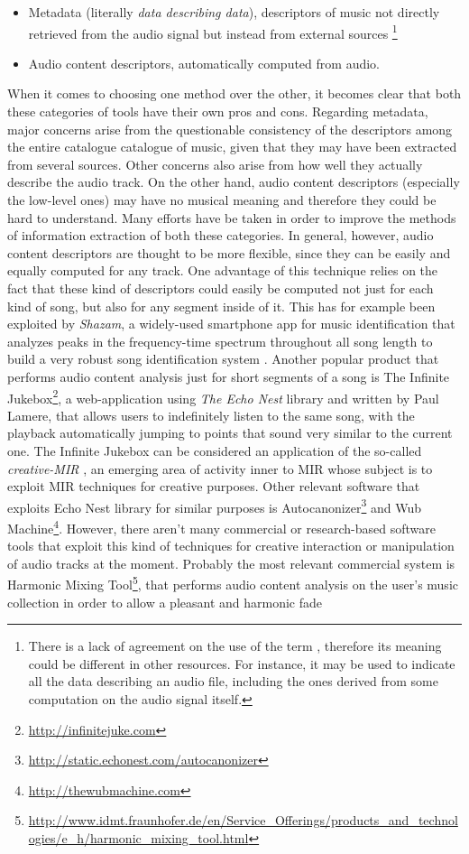 \begin{itemize}
\item Metadata (literally \textit{data describing data}), descriptors of music not directly retrieved from the audio signal but instead from external sources \footnote{There is a lack of agreement on the use of the term , therefore its meaning could be different in other resources. For instance, it may be used to indicate all the data describing an audio file, including the ones derived from some computation on the audio signal itself.}
\item Audio content descriptors, automatically computed from audio.
\end{itemize}
When it comes to choosing one method over the other, it becomes clear that both these categories of tools have their own pros and cons. Regarding metadata, major concerns arise from the questionable consistency of the descriptors among the entire catalogue catalogue of music, given that they may have been extracted from several sources. Other concerns also arise from how well they actually describe the audio track. On the other hand, audio content descriptors (especially the low-level ones) may have no musical meaning and therefore they could be hard to understand. Many efforts have be taken in order to improve the methods of information extraction of both these categories. In general, however, audio content descriptors are thought to be more flexible, since they can be easily and equally computed for any track. One advantage of this technique relies on the fact that these kind of descriptors could easily be computed not just for each kind of song, but also for any segment inside of it. This has for example been exploited by \textit{Shazam}, a widely-used smartphone app for music identification that analyzes peaks in the frequency-time spectrum throughout all song length to build a very robust song identification system \cite{shazam03}. Another popular product that performs audio content analysis just for short segments of a song is The Infinite Jukebox\footnote{\url{http://infinitejuke.com}}, a web-application using \textit{The Echo Nest} library and written by Paul Lamere, that allows users to indefinitely listen to the same song, with the playback automatically jumping to points that sound very similar to the current one. The Infinite Jukebox can be considered an application of the so-called \textit{creative-MIR} \cite{xavier2013}, an emerging area of activity inner to MIR whose subject is to exploit MIR techniques for creative purposes.  Other relevant software that exploits Echo Nest library for similar purposes is Autocanonizer\footnote{\url{http://static.echonest.com/autocanonizer}} and Wub Machine\footnote{\url{http://thewubmachine.com}}. However, there aren't many commercial or research-based software tools that exploit this kind of techniques for creative interaction or manipulation of audio tracks at the moment. Probably the most relevant commercial system is Harmonic Mixing Tool\footnote{\url{http://www.idmt.fraunhofer.de/en/Service_Offerings/products_and_technologies/e_h/harmonic_mixing_tool.html}}, that performs audio content analysis on the user's music collection in order to allow a pleasant and harmonic fade 